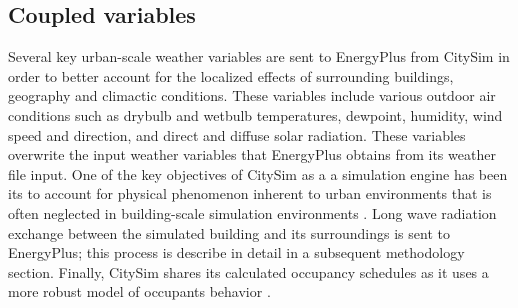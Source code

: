 \documentclass{tBPS2e}
\theoremstyle{plain}
\theoremstyle{definition}
\theoremstyle{remark}
\begin{document}


\subsection{Coupled variables}

Several key urban-scale weather variables are sent to EnergyPlus from CitySim in order to better account for the localized effects of surrounding buildings, geography and climactic conditions. These variables include various outdoor air conditions such as drybulb and wetbulb temperatures, dewpoint, humidity, wind speed and direction, and direct and diffuse solar radiation. These variables overwrite the input weather variables that EnergyPlus obtains from its weather file input. One of the key objectives of CitySim as a a simulation engine has been its to account for physical phenomenon inherent to urban environments that is often neglected in building-scale simulation environments \citep{Robinson:2004cr,Robinson:2009tm}. Long wave radiation exchange between the simulated building and its surroundings is sent to EnergyPlus; this process is describe in detail in a subsequent methodology section. Finally, CitySim shares its calculated occupancy schedules as it uses a more robust model of occupants behavior \citep{Haldi:2011dr}.
\end{document}
